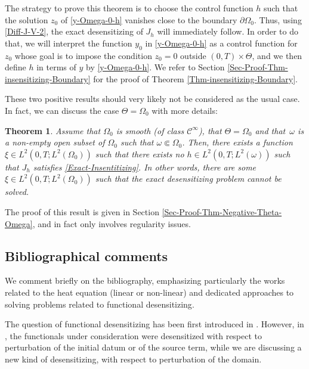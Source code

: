 \documentclass[JEP,XML,SOM,Unicode,NoFloatCountersInSection]{cedram}
\newcounter{question}
\newtheorem{theorem}{Theorem}[section]
\theoremstyle{definition}
\begin{document}
The strategy to prove this theorem is to choose the control function $h$ such that the solution $z_0$ of \eqref{y-Omega-0-h} vanishes close to the boundary $\partial \Omega_0$. Thus, using \eqref{Diff-J-V-2}, the exact desensitizing of $J_h$ will immediately follow. In order to do that, we will interpret the function $y_0$ in \eqref{y-Omega-0-h} as a control function for $z_0$ whose goal is to impose the condition $z_0 = 0$ outside $(0,T) \times \Theta$, and we then define $h$ in terms of $y$ by \eqref{y-Omega-0-h}. We refer to Section \ref{Sec-Proof-Thm-insensitizing-Boundary} for the proof of Theorem \ref{Thm-insensitizing-Boundary}.

These two positive results should very likely not be considered as the usual case. In fact, we can discuss the case $\Theta = \Omega_0$ with more details:

\begin{theorem}
\label{Thm-Negative-Theta-Omega}
Assume that {$\Omega_0$ is smooth (of class $\mathscr{C}^\infty$)}, that $\Theta = \Omega_0$ and that~$\omega$ is a non-empty open subset of $\Omega_0$ such that $\omega \Subset \Omega_0$. Then, there exists a function $\xi \in L^2(0,T; L^2(\Omega_0))$ such that there exists no $h \in L^2(0,T; L^2(\omega))$ such that $J_h$ satisfies \eqref{Exact-Insentitizing}. In other words, there are some $\xi \in L^2(0,T; L^2(\Omega_0))$ such that the exact desensitizing problem cannot be solved.
\end{theorem}

The proof of this result is given in Section \ref{Sec-Proof-Thm-Negative-Theta-Omega}, and in fact only involves regularity issues.

\subsection{Bibliographical comments}\label{sec:SoA}

We comment briefly on the bibliography, emphasizing particularly the works related to the heat equation (linear or non-linear) and dedicated approaches to solving problems related to {functional desensitizing}.

The question of {functional desensitizing} has been first introduced in \cite{Lions-Sentinelles-1992,Bodart-Fabre}. However, in \cite{Lions-Sentinelles-1992,Bodart-Fabre}, the functionals under consideration were desensitized with respect to perturbation of the initial datum or of the source term, while we are discussing a new kind of desensitizing, with respect to perturbation of the domain.
\end{document}
